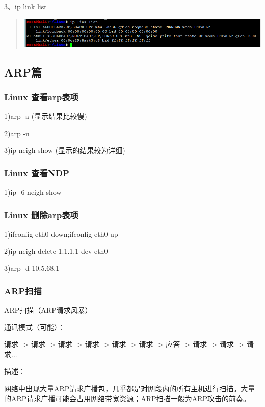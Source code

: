 \documentclass[letterpaper,10pt]{sphinxmanual}
\begin{document}
3、ip link list
\begin{quote}

\includegraphics{link-list.png}
\end{quote}


\subsection{ARP篇}
\label{Linux_net/arp:arp}\label{Linux_net/arp::doc}

\subsubsection{Linux 查看arp表项}
\label{Linux_net/arp:linux-arp}
1)arp -a (显示结果比较慢)

2)arp -n

3)ip neigh show (显示的结果较为详细)


\subsubsection{Linux 查看NDP}
\label{Linux_net/arp:linux-ndp}
1)ip -6 neigh show


\subsubsection{Linux 删除arp表项}
\label{Linux_net/arp:id1}
1)ifconfig eth0 down;ifconfig eth0 up

2)ip neigh delete 1.1.1.1 dev eth0

3)arp -d 10.5.68.1


\subsubsection{ARP扫描}
\label{Linux_net/arp:id2}
ARP扫描（ARP请求风暴）

通讯模式（可能）：

请求 -\textgreater{} 请求 -\textgreater{} 请求 -\textgreater{} 请求 -\textgreater{} 请求 -\textgreater{} 请求 -\textgreater{} 应答 -\textgreater{} 请求 -\textgreater{} 请求 -\textgreater{} 请求...

描述：

网络中出现大量ARP请求广播包，几乎都是对网段内的所有主机进行扫描。大量的ARP请求广播可能会占用网络带宽资源；ARP扫描一般为ARP攻击的前奏。
\end{document}
